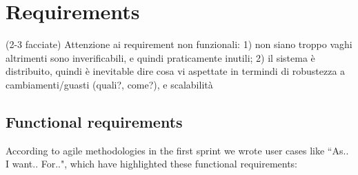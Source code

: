 \documentclass[a4paper,12pt]{report}
\begin{document}

\chapter{Requirements}
(2-3 facciate)
Attenzione ai requirement non funzionali: 1) non siano troppo vaghi altrimenti sono inverificabili, e quindi praticamente inutili; 2) il sistema è distribuito, quindi è inevitable dire cosa vi aspettate in termindi di robustezza a cambiamenti/guasti (quali?, come?), e scalabilità

\section{Functional requirements}

According to agile methodologies in the first sprint we wrote user cases like ``As.. I want.. For..", which have highlighted these functional requirements:
\end{document}
